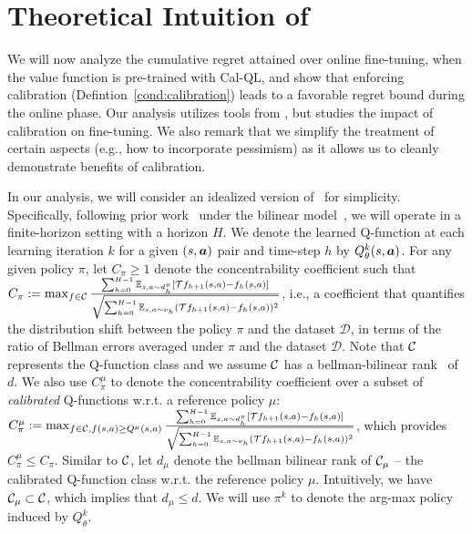 \vspace{-0.2cm}
\section{Theoretical Intuition of \methodname}
\label{sec:calql_theory}
\vspace{-0.25cm}

We will now analyze the cumulative regret attained over online fine-tuning, when the value function is pre-trained with Cal-QL, and show that enforcing calibration (Defintion~\ref{cond:calibration}) leads to a favorable regret bound during the online phase. Our analysis utilizes tools from \citet{song2023hybrid}, but studies the impact of calibration on fine-tuning. We also remark that we simplify the treatment of certain aspects (e.g., how to incorporate pessimism) as it allows us to cleanly demonstrate benefits of calibration.  

 In our analysis, we will consider an idealized version of \methodname\ for simplicity. Specifically, following prior work~\citep{song2023hybrid} under the bilinear model~\citep{du2021bilinear}, we will operate in a finite-horizon setting with a horizon $H$. We denote the learned Q-function at each learning iteration $k$ for a given $(s, \boldsymbol{a})$ pair and time-step $h$ by $Q_{\theta}^k(s, \boldsymbol{a})$. For any given policy $\pi$, let $C_\pi\geq1$ denote the concentrability coefficient such that $C_\pi:=\max_{f\in \mathcal C}\frac{\sum_{h=0}^{H-1}\mathbb E_{s,a\sim d_h^\pi}[\mathcal T f_{h+1}(s,a)-f_h(s,a)]}{\sqrt{\sum_{h=0}^{H-1}\mathbb E_{s,a\sim \nu_h}(\mathcal T f_{h+1}(s,a)-f_h(s,a))^2}}$,
i.e., a coefficient that quantifies the distribution shift between the policy $\pi$ and the dataset $\mathcal{D}$, in terms of the ratio of Bellman errors averaged under $\pi$ and the dataset $\mathcal{D}$. Note that $\mathcal C$ represents the Q-function class and we assume $\mathcal C$ has a bellman-bilinear rank~\citep{du2021bilinear} of $d$. We also use $C_\pi^\mu$ to denote the concentrability coefficient over a subset of {\em calibrated} Q-functions w.r.t. a reference policy $\mu$: $C^\mu_\pi:=\max_{f\in \mathcal C,f(s,a)\geq Q^\mu(s,a)}\frac{\sum_{h=0}^{H-1}\mathbb E_{s,a\sim d_h^\pi}[\mathcal T f_{h+1}(s,a)-f_h(s,a)]}{\sqrt{\sum_{h=0}^{H-1}\mathbb E_{s,a\sim \nu_h}(\mathcal T f_{h+1}(s,a)-f_h(s,a))^2}}$, which provides $C^\mu_\pi\leq C_\pi$. Similar to $\mathcal C$, let $d_\mu$ denote the bellman bilinear rank of $\mathcal C_\mu$ -- 
the calibrated Q-function class w.r.t. the reference policy $\mu$.
Intuitively, we have $\mathcal C_\mu\subset\mathcal C$, which implies that $d_\mu\leq d$. 
We will use $\pi^k$ to denote the arg-max policy induced by $Q^k_\theta$. 

